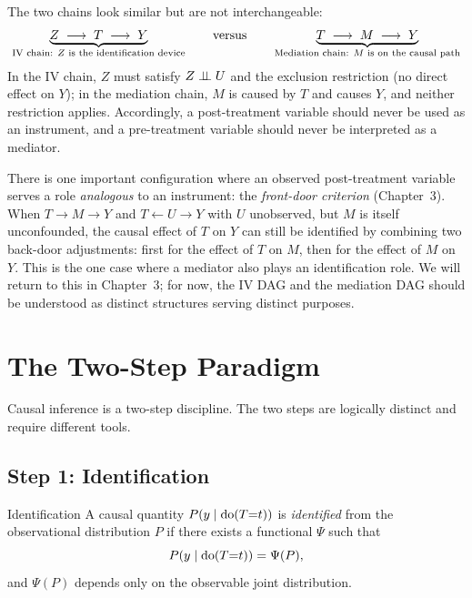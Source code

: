 \documentclass[master.tex]{subfiles}
\begin{document}
The two chains look similar but are not interchangeable:
\[
  \underbrace{Z \;\longrightarrow\; T \;\longrightarrow\; Y}_{%
    \text{IV chain: } Z \text{ is the identification device}}
  \qquad\text{versus}\qquad
  \underbrace{T \;\longrightarrow\; M \;\longrightarrow\; Y}_{%
    \text{Mediation chain: } M \text{ is on the causal path}}
\]
In the IV chain, $Z$ must satisfy $Z \perp\!\!\!\perp U$ and the exclusion restriction
(no direct effect on $Y$); in the mediation chain, $M$ is caused by $T$ and
causes $Y$, and neither restriction applies.
Accordingly, a post-treatment variable should never be used as an instrument,
and a pre-treatment variable should never be interpreted as a mediator.

\begin{remark}
There is one important configuration where an observed post-treatment
variable serves a role \emph{analogous} to an instrument: the
\emph{front-door criterion} (Chapter~3).  When $T \to M \to Y$ and
$T \leftarrow U \to Y$ with $U$ unobserved, but $M$ is itself unconfounded,
the causal effect of $T$ on $Y$ can still be identified by combining two
back-door adjustments: first for the effect of $T$ on $M$, then for the
effect of $M$ on $Y$.  This is the one case where a mediator also plays an
identification role.  We will return to this in Chapter~3; for now, the IV
DAG and the mediation DAG should be understood as distinct structures
serving distinct purposes.
\end{remark}

\section{The Two-Step Paradigm}
\label{w1:sec:two-step}

Causal inference is a two-step discipline.  The two steps are logically
distinct and require different tools.

\subsection{Step 1: Identification}

\begin{defn}{Identification}
A causal quantity $P(y \mid \mathrm{do}(T{=}t))$ is \emph{identified} from the
observational distribution $P$ if there exists a functional $\Psi$ such
that
\[
  P(y \mid \mathrm{do}(T{=}t)) = \Psi(P),
\]
and $\Psi(P)$ depends only on the observable joint distribution.
\end{defn}
\end{document}
